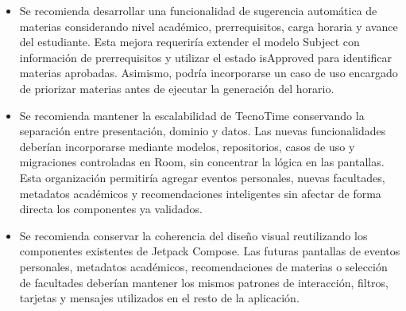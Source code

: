 \begin{itemize}
\item Se recomienda desarrollar una funcionalidad de sugerencia automática de materias considerando nivel académico, prerrequisitos, carga horaria y avance del estudiante. Esta mejora requeriría extender el modelo Subject con información de prerrequisitos y utilizar el estado isApproved para identificar materias aprobadas. Asimismo, podría incorporarse un caso de uso encargado de priorizar materias antes de ejecutar la generación del horario.

\item Se recomienda mantener la escalabilidad de TecnoTime conservando la separación entre presentación, dominio y datos. Las nuevas funcionalidades deberían incorporarse mediante modelos, repositorios, casos de uso y migraciones controladas en Room, sin concentrar la lógica en las pantallas. Esta organización permitiría agregar eventos personales, nuevas facultades, metadatos académicos y recomendaciones inteligentes sin afectar de forma directa los componentes ya validados.

\item Se recomienda conservar la coherencia del diseño visual reutilizando los componentes existentes de Jetpack Compose. Las futuras pantallas de eventos personales, metadatos académicos, recomendaciones de materias o selección de facultades deberían mantener los mismos patrones de interacción, filtros, tarjetas y mensajes utilizados en el resto de la aplicación.

\end{itemize}
